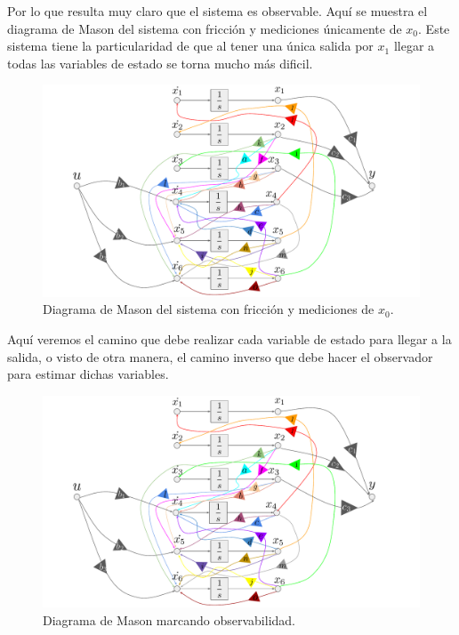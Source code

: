 Por lo que resulta muy claro que el sistema es observable.
Aquí se muestra el diagrama de Mason del sistema con fricción y mediciones únicamente de $x_0$. Este sistema tiene la particularidad de que al tener una única salida por $x_1$ llegar a todas las variables de estado se torna mucho más dificil.
\begin{figure}[H]
	\centering
	\includegraphics[width=1\linewidth,page = 4]{../Modelo Teorico/ImagenesModelo Teorico/Mason.pdf}
	\caption{Diagrama de Mason del sistema con fricción y mediciones de $x_0$.}	
	\label{fig:masonsisfyxom}
\end{figure}
Aquí veremos el camino que debe realizar cada variable de estado para llegar a la salida, o visto de otra manera, el camino inverso que debe hacer el observador para estimar dichas variables.
\begin{figure}[H]
	\centering
	\includegraphics[width=1.2\linewidth,page = 5]{../Modelo Teorico/ImagenesModelo Teorico/Mason.pdf}
	\caption{Diagrama de Mason marcando observabilidad.}	
	\label{fig:masonsisfyxomO}
\end{figure}

